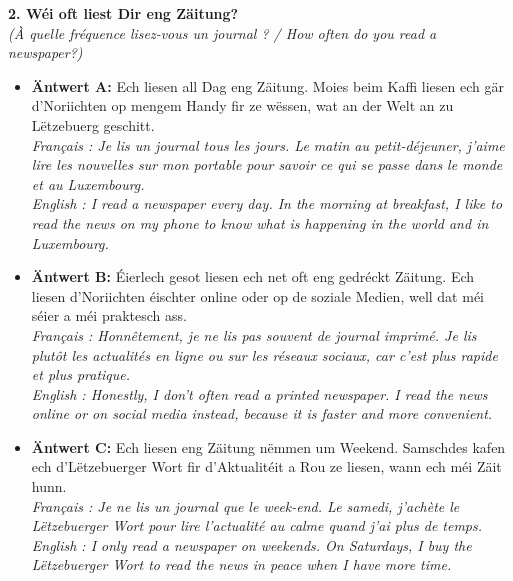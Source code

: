 \noindent\textbf{2. Wéi oft liest Dir eng Zäitung?}\\
\textit{(À quelle fréquence lisez-vous un journal ? / How often do you read a newspaper?)}
\begin{itemize}
    \item \textbf{Äntwert A:} Ech liesen all Dag eng Zäitung. Moies beim Kaffi liesen ech gär d'Noriichten op mengem Handy fir ze wëssen, wat an der Welt an zu Lëtzebuerg geschitt.\\
    \textit{Français : Je lis un journal tous les jours. Le matin au petit-déjeuner, j'aime lire les nouvelles sur mon portable pour savoir ce qui se passe dans le monde et au Luxembourg.}\\
    \textit{English : I read a newspaper every day. In the morning at breakfast, I like to read the news on my phone to know what is happening in the world and in Luxembourg.}
    \item \textbf{Äntwert B:} Éierlech gesot liesen ech net oft eng gedréckt Zäitung. Ech liesen d'Noriichten éischter online oder op de soziale Medien, well dat méi séier a méi praktesch ass.\\
    \textit{Français : Honnêtement, je ne lis pas souvent de journal imprimé. Je lis plutôt les actualités en ligne ou sur les réseaux sociaux, car c'est plus rapide et plus pratique.}\\
    \textit{English : Honestly, I don't often read a printed newspaper. I read the news online or on social media instead, because it is faster and more convenient.}
    \item \textbf{Äntwert C:} Ech liesen eng Zäitung nëmmen um Weekend. Samschdes kafen ech d'Lëtzebuerger Wort fir d'Aktualitéit a Rou ze liesen, wann ech méi Zäit hunn.\\
    \textit{Français : Je ne lis un journal que le week-end. Le samedi, j'achète le Lëtzebuerger Wort pour lire l'actualité au calme quand j'ai plus de temps.}\\
    \textit{English : I only read a newspaper on weekends. On Saturdays, I buy the Lëtzebuerger Wort to read the news in peace when I have more time.}
\end{itemize}
\vspace{0.5em}

